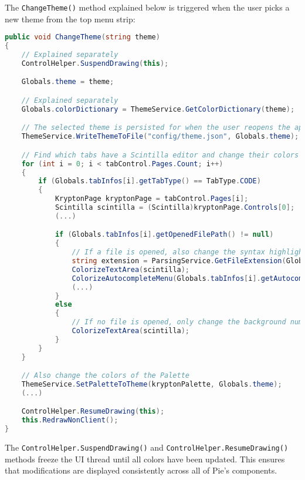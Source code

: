 The \texttt{ChangeTheme()} method explained below is triggered when the user picks a new theme from the top menu strip:

\begin{lstlisting}[language=csharp, caption={The ChangeTheme() method extracts the color scheme definition of a theme and sets its corresponding colors to Pie's global kryptonPalette control}]
public void ChangeTheme(string theme)
{
    // Explained separately
    ControlHelper.SuspendDrawing(this);

    Globals.theme = theme;

    // Explained separately
    Globals.colorDictionary = ThemeService.GetColorDictionary(theme);

    // The selected theme is persisted for when the user reopens the application
    ThemeService.WriteThemeToFile("config/theme.json", Globals.theme);

    // Find which tabs have a Scintilla editor and change their colors too
    for (int i = 0; i < tabControl.Pages.Count; i++)
    {
        if (Globals.tabInfos[i].getTabType() == TabType.CODE)
        {
            KryptonPage kryptonPage = tabControl.Pages[i];
            Scintilla scintilla = (Scintilla)kryptonPage.Controls[0];
            (...)

            if (Globals.tabInfos[i].getOpenedFilePath() != null)
            {
                // If a file is opened, also change the syntax highlighting color and the color of the autocomplete menu
                string extension = ParsingService.GetFileExtension(Globals.tabInfos[i].getOpenedFilePath());
                ColorizeTextArea(scintilla);
                ColorizeAutocompleteMenu(Globals.tabInfos[i].getAutocompleteMenu());
                (...)
            }
            else
            {
                // If no file is opened, only change the background number margin and code folding color of Scintilla
                ColorizeTextArea(scintilla);
            }
        }
    }

    // Also change the colors of the Palette
    ThemeService.SetPaletteToTheme(kryptonPalette, Globals.theme);
    (...)

    ControlHelper.ResumeDrawing(this);
    this.RedrawNonClient();
}
\end{lstlisting}

The \texttt{ControlHelper.SuspendDrawing()} and \texttt{ControlHelper.ResumeDrawing()} methods freeze the UI thread until all colors have been updated. This ensures that modifications are displayed consistently across all of Pie's components. 

